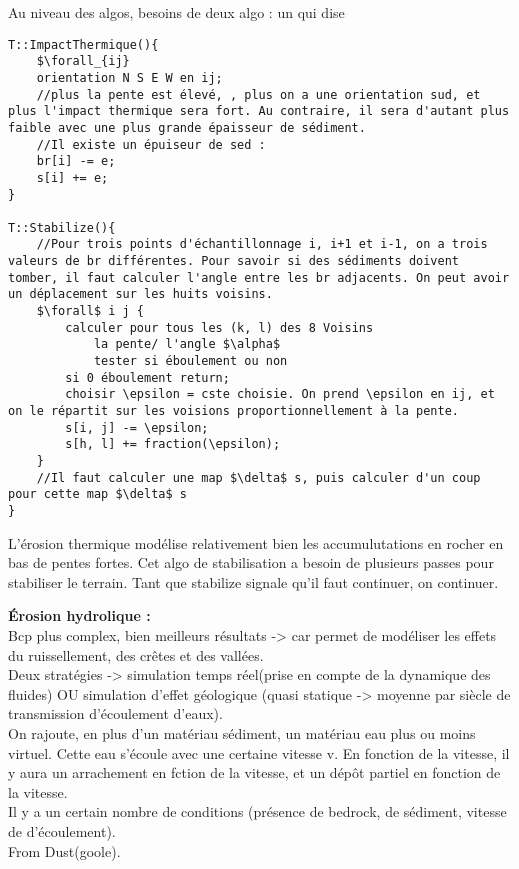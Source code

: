 \documentclass[11pt]{article}
\begin{document}
{Au niveau des algos, besoins de deux algo : un qui dise 
\begin{verbatim}
T::ImpactThermique(){
	$\forall_{ij}
	orientation N S E W en ij;
	//plus la pente est élevé, , plus on a une orientation sud, et plus l'impact thermique sera fort. Au contraire, il sera d'autant plus faible avec une plus grande épaisseur de sédiment.
	//Il existe un épuiseur de sed :
	br[i] -= e;
	s[i] += e;
}

T::Stabilize(){
	//Pour trois points d'échantillonnage i, i+1 et i-1, on a trois valeurs de br différentes. Pour savoir si des sédiments doivent tomber, il faut calculer l'angle entre les br adjacents. On peut avoir un déplacement sur les huits voisins.
	$\forall$ i j {
		calculer pour tous les (k, l) des 8 Voisins
			la pente/ l'angle $\alpha$
			tester si éboulement ou non
		si 0 éboulement return;
		choisir \epsilon = cste choisie. On prend \epsilon en ij, et on le répartit sur les voisions proportionnellement à la pente.
		s[i, j] -= \epsilon;
		s[h, l] += fraction(\epsilon);
	}
	//Il faut calculer une map $\delta$ s, puis calculer d'un coup pour cette map $\delta$ s
}
\end{verbatim}
L'érosion thermique modélise relativement bien les accumulutations en rocher en bas de pentes fortes. Cet algo de stabilisation a besoin de plusieurs passes pour stabiliser le terrain. Tant que stabilize signale qu'il faut continuer, on continuer.

\vskip 1cm
\textbf{Érosion hydrolique :}\\
Bcp plus complex, bien meilleurs résultats -> car permet de modéliser les effets du ruissellement, des crêtes et des vallées.\\
Deux stratégies -> simulation temps réel(prise en compte de la dynamique des fluides) OU simulation d'effet géologique (quasi statique -> moyenne par siècle de transmission d'écoulement d'eaux).\\

On rajoute, en plus d'un matériau sédiment, un matériau eau plus ou moins virtuel. Cette eau s'écoule avec une certaine vitesse v. En fonction de la vitesse, il y aura un arrachement en fction de la vitesse, et un dépôt partiel en fonction de la vitesse.\\
Il y a un certain nombre de conditions (présence de bedrock, de sédiment, vitesse de d'écoulement).\\

From Dust(goole).
\vskip 2cm
}
\end{document}
